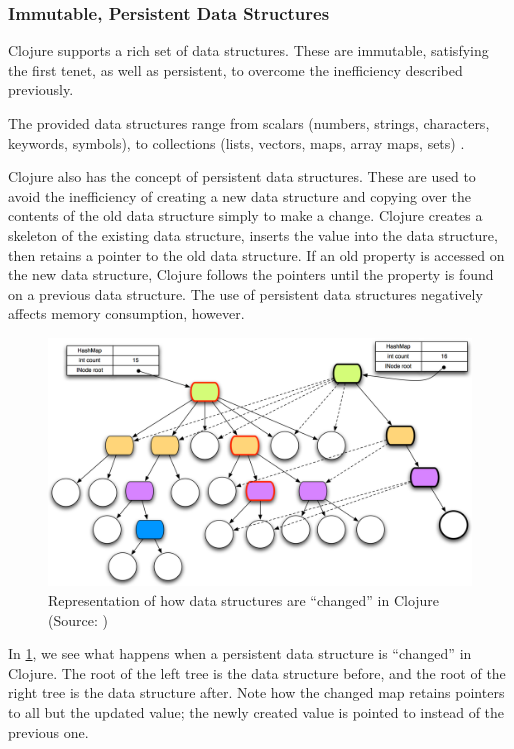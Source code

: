 		\subsubsection{Immutable, Persistent Data Structures}
			Clojure supports a rich set of data structures.  These are immutable, satisfying the first tenet, as well as persistent, to overcome the inefficiency described previously.
			
			The provided data structures range from scalars (numbers, strings, characters, keywords, symbols), to collections (lists, vectors, maps, array maps, sets) \cite{clj-data-structures}.
			
			Clojure also has the concept of persistent data structures.  These are used to avoid the inefficiency of creating a new data structure and copying over the contents of the old data structure simply to make a change.  Clojure creates a skeleton of the existing data structure, inserts the value into the data structure, then retains a pointer to the old data structure.  If an old property is accessed on the new data structure, Clojure follows the pointers until the property is found on a previous data structure.  The use of persistent data structures negatively affects memory consumption, however.
			
			\begin{figure}
				\centering
				
				\includegraphics[scale=0.42]{figures/diagrams/persistent-data-structure}
				
				\caption{Representation of how data structures are ``changed'' in Clojure (Source:  \cite{clj-persistent})}
				\label{fig:persistent-data-structure}
			\end{figure}
			
			In \cref{fig:persistent-data-structure}, we see what happens when a persistent data structure is ``changed'' in Clojure.  The root of the left tree is the data structure before, and the root of the right tree is the data structure after.  Note how the changed map retains pointers to all but the updated value; the newly created value is pointed to instead of the previous one.
		
